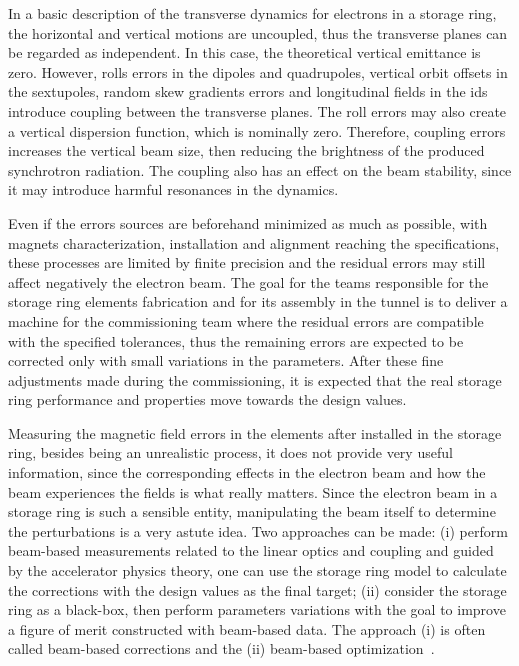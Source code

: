 In a basic description of the transverse dynamics for electrons in a storage ring, the horizontal and vertical motions are uncoupled, thus the transverse planes can be regarded as independent. In this case, the theoretical vertical emittance is zero. However, rolls errors in the dipoles and quadrupoles, vertical orbit offsets in the sextupoles, random skew gradients errors and longitudinal fields in the \glspl{id} introduce coupling between the transverse planes. The roll errors may also create a vertical dispersion function, which is nominally zero. Therefore, coupling errors increases the vertical beam size, then reducing the brightness of the produced synchrotron radiation. The coupling also has an effect on the beam stability, since it may introduce harmful resonances in the dynamics.

Even if the errors sources are beforehand minimized as much as possible, with magnets characterization, installation and alignment reaching the specifications, these processes are limited by finite precision and the residual errors may still affect negatively the electron beam. The goal for the teams responsible for the storage ring elements fabrication and for its assembly in the tunnel is to deliver a machine for the commissioning team where the residual errors are compatible with the specified tolerances, thus the remaining errors are expected to be corrected only with small variations in the parameters. After these fine adjustments made during the commissioning, it is expected that the real storage ring performance and properties move towards the design values.

Measuring the magnetic field errors in the elements after installed in the storage ring, besides being an unrealistic process, it does not provide very useful information, since the corresponding effects in the electron beam and how the beam experiences the fields is what really matters. Since the electron beam in a storage ring is such a sensible entity, manipulating the beam itself to determine the perturbations is a very astute idea. Two approaches can be made: (i) perform beam-based measurements related to the linear optics and coupling and guided by the accelerator physics theory, one can use the storage ring model to calculate the corrections with the design values as the final target; (ii) consider the storage ring as a black-box, then perform parameters variations with the goal to improve a figure of merit constructed with beam-based data. The approach (i) is often called beam-based corrections and the (ii) beam-based optimization~\cite{huang2019beam}.


